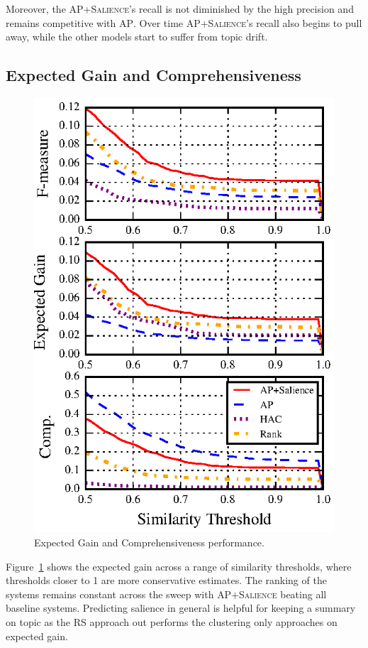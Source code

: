 Moreover, the \textsc{AP+Salience}'s recall is not diminished by the high 
precision and remains competitive with \textsc{AP}. Over time 
\textsc{AP+Salience}'s recall also begins to pull away, while the other models
start to suffer from topic drift.


\subsection{Expected Gain and Comprehensiveness}
\begin{figure}[h]
  \includegraphics[]{nuggets-metrics.eps}
\caption{Expected Gain and Comprehensiveness performance.}
\label{fig:nperf}
\end{figure}


Figure~\ref{fig:nperf} shows the expected gain across a range of similarity 
thresholds, where thresholds closer to 1 are more conservative estimates. 
The ranking of the systems remains constant across the sweep with 
\textsc{AP+Salience} beating all baseline systems. Predicting salience in 
general is helpful for keeping a summary on topic as the \textsc{RS} approach 
out performs the clustering only approaches on expected gain.


